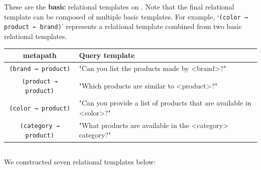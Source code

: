 
 These are the \textbf{basic} relational templates on \amazont. Note that the final relational template can be composed of multiple basic templates. For example, `\texttt{(color → product ← brand)}' represents a relational template combined from two basic relational templates.
\begin{table}[h]
\begin{tabularx}{\textwidth}{c|X}
\toprule
metapath          & Query template\\
\midrule
\texttt{(brand → product)} & "Can you list the products made by <brand>?" \\
\texttt{(product → product)} & "Which products are similar to <product>?" \\
\texttt{(color → product)} & "Can you provide a list of products that are available in <color>?" \\
\texttt{(category → product)}& "What products are available in the <category> category?" \\
\bottomrule
\end{tabularx}
\end{table}




\subsection{\magt}
\label{app:mag}

 We constructed seven relational templates below:

